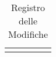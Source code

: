 \begin{center}
\begin{longtable}[c]{|m{}|m{}|m{}|m{}|p{}|}
\hline
\caption{Registro delle Modifiche}
\end{longtable}
\end{center}